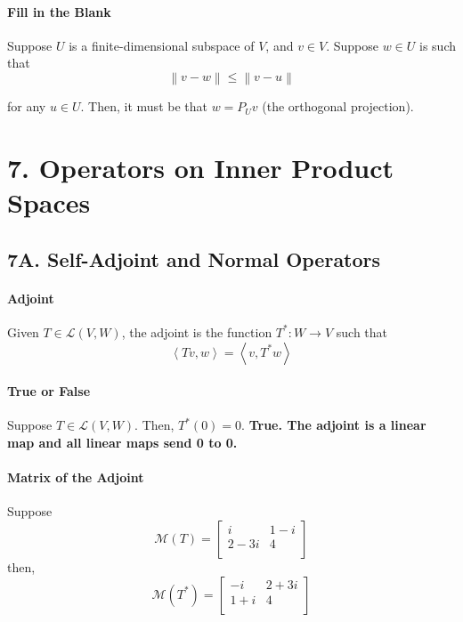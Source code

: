 \documentclass{article}
\newcommand{\norm}[1]{\left\lVert#1\right\rVert}
\newcommand{\iprod}[2]{\left\langle#1,#2\right\rangle}
\begin{document}
\paragraph{Fill in the Blank} Suppose $U$ is a finite-dimensional subspace of $V$, and $v \in V$. Suppose $w \in U$ is such that
\[ \norm{v - w} \leq \norm{v - u} \]

for any $u \in U$. Then, it must be that $w = P_Uv$ (the orthogonal projection).

\section*{7. Operators on Inner Product Spaces}
\subsection*{7A. Self-Adjoint and Normal Operators}
\paragraph{Adjoint} Given $T \in \mathcal{L}(V, W)$, the adjoint is the function $T^*: W \rightarrow V$ such that
\[\iprod{Tv}{w} = \iprod{v}{T^*w}\]

\paragraph{True or False} Suppose $T \in \mathcal{L}(V, W)$. Then, $T^*(0) = 0$. \textbf{True. The adjoint is a linear map and all linear maps send 0 to 0.}

\paragraph{Matrix of the Adjoint}
Suppose 
\[\mathcal{M}(T) = 
\begin{bmatrix}
    i & 1-i \\
    2 - 3i & 4\\
\end{bmatrix}
\]
then,
\[\mathcal{M}(T^*) = 
\begin{bmatrix}
    -i & 2 + 3i \\
    1 + i & 4 \\
\end{bmatrix}
\]
\end{document}
